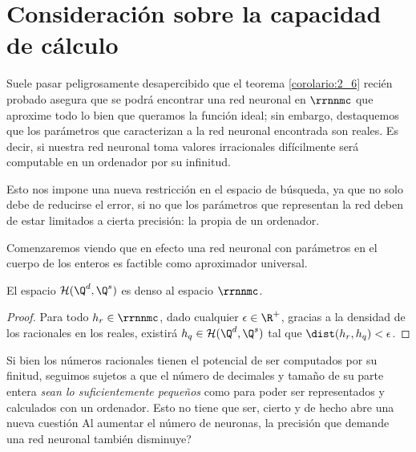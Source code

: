 \section{Consideración sobre la capacidad de cálculo}

Suele pasar peligrosamente desapercibido que el teorema  \ref{corolario:2_6} recién probado asegura
que se podrá encontrar una red neuronal en $\rrnnmc$
que aproxime todo lo bien que queramos la función ideal; sin embargo, destaquemos que los parámetros que caracterizan a la red neuronal encontrada son reales. Es decir, 
si nuestra red neuronal toma valores irracionales difícilmente será computable en un ordenador por su infinitud. 

Esto nos impone una nueva restricción en el espacio de búsqueda, ya que no solo debe de reducirse el error, si no que los parámetros que representan la red deben de estar limitados a cierta precisión: la propia de un ordenador.  

Comenzaremos viendo que en efecto una red neuronal con parámetros en el cuerpo de los enteros es factible como aproximador universal. 

\begin{aportacionOriginal}
    \begin{teorema}
        El espacio $\mathcal{H}(\Q^d, \Q^s)$ es denso al espacio $\rrnnmc$. 
    \end{teorema}
    \begin{proof}
        Para todo $h_r \in \rrnnmc$, dado cualquier $\epsilon \in \R^+$, 
        gracias a la densidad de los racionales en los reales, 
        existirá $h_q \in \mathcal{H}(\Q^d, \Q^s)$ tal que 
        $\dist( h_r, h_q) < \epsilon$. 
    \end{proof}

    Si bien los números racionales tienen el potencial de ser computados por su 
    finitud, seguimos sujetos a que el número de decimales y tamaño de su parte entera \textit{sean lo suficientemente pequeños} como para poder ser representados 
    y calculados con un ordenador. Esto no tiene que ser, cierto y de hecho abre una nueva cuestión
     Al aumentar el número de neuronas, la precisión que demande una red neuronal también disminuye?  
\end{aportacionOriginal} 

